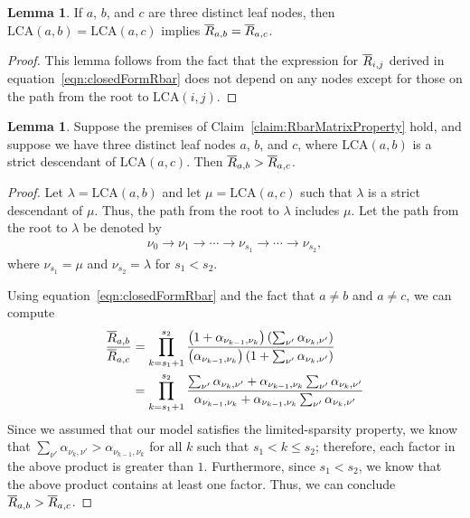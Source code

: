 \documentclass{article}
\theoremstyle{definition}
\newtheorem{lemma}[thm]{Lemma}
\begin{document}
\begin{lemma}
If $a$, $b$, and $c$ are three distinct leaf nodes, then $\text{LCA}(a,b) = \text{LCA}(a,c)$ implies $\overline{R}_{a,b} = \overline{R}_{a,c}$.
\label{lemma:equalLCA}
\end{lemma}

\begin{proof}
This lemma follows from the fact that the expression for $\overline{R}_{i,j}$ derived in equation~\eqref{eqn:closedFormRbar} does not depend on any nodes except for those on the path from the root to $\text{LCA}(i,j)$.
\end{proof}

\begin{lemma}
Suppose the premises of Claim~\ref{claim:RbarMatrixProperty} hold, and suppose we have three distinct leaf nodes $a$, $b$, and $c$, where $\text{LCA}(a,b)$ is a strict descendant of $\text{LCA}(a,c)$.
Then $\overline{R}_{a,b} > \overline{R}_{a,c}$.
\label{lemma:greaterLCA}
\end{lemma}

\begin{proof}
Let $\lambda = \text{LCA}(a,b)$ and let $\mu = \text{LCA}(a,c)$ such that $\lambda$ is a strict descendant of $\mu$.
Thus, the path from the root to $\lambda$ includes $\mu$.
Let the path from the root to $\lambda$ be denoted by
\begin{align}
\nu_0 \to \nu_1 \to \cdots \to \nu_{s_1} \to \cdots \to \nu_{s_2},
\end{align}
where $\nu_{s_1} = \mu$ and $\nu_{s_2} = \lambda$ for $s_1 < s_2$.

Using equation~\eqref{eqn:closedFormRbar} and the fact that $a \neq b$ and $a \neq c$, we can compute
\begin{align}
\frac{\overline{R}_{a,b}}{\overline{R}_{a,c}}
&=
\prod_{k=s_1+1}^{s_2}
\frac
  { \left( 1 + \alpha_{\nu_{k-1}, \nu_k} \right) \left( \sum_{\nu'} \alpha_{\nu_k, \nu'} \right) }
  { \left( \alpha_{\nu_{k-1}, \nu_k} \right) \left( 1 + \sum_{\nu'} \alpha_{\nu_k, \nu'} \right) }
\\
&=
\prod_{k=s_1+1}^{s_2}
\frac
  { \sum_{\nu'} \alpha_{\nu_k, \nu'} + \alpha_{\nu_{k-1}, \nu_k} \sum_{\nu'} \alpha_{\nu_k, \nu'} }
  { \alpha_{\nu_{k-1}, \nu_k} + \alpha_{\nu_{k-1}, \nu_k} \sum_{\nu'} \alpha_{\nu_k, \nu'} }
\end{align}
%
Since we assumed that our model satisfies the limited-sparsity property, we know that $\sum_{\nu'} \alpha_{\nu_k, \nu'} > \alpha_{\nu_{k-1}, \nu_k}$ for all $k$ such that $s_1 < k \leq s_2$; therefore, each factor in the above product is greater than $1$.
Furthermore, since $s_1 < s_2$, we know that the above product contains at least one factor.
Thus, we can conclude $\overline{R}_{a,b} > \overline{R}_{a,c}$.
\end{proof}
\end{document}
